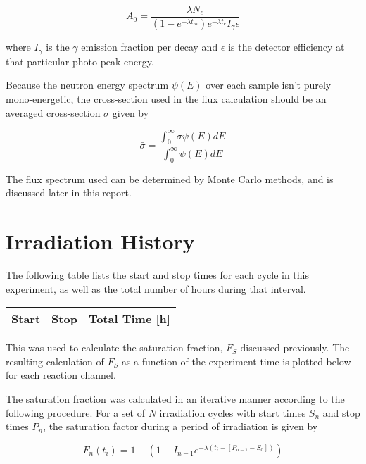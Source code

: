 \documentclass[aps,twocolumn,secnumarabic,balancelastpage,amsmath,amssymb,nofootinbib,floatfix]{revtex4-1}
\begin{document}
\begin{equation}
A_0 = \frac{\lambda N_c}{(1-e^{-\lambda t_m})e^{-\lambda t_c}I_{\gamma}\epsilon}
\label{eq:activity}
\end{equation}

where $I_{\gamma}$ is the $\gamma$ emission fraction per decay and $\epsilon$ is the detector efficiency at that particular photo-peak energy.

Because the neutron energy spectrum $\psi(E)$ over each sample isn't purely mono-energetic, the cross-section used in the flux calculation should be an averaged cross-section $\bar{\sigma}$ given by

\begin{equation}
\bar{\sigma} = \frac{\int_0^{\infty}\sigma\psi(E)dE}{\int_0^{\infty}\psi(E)dE}
\label{eq:avg_xs}
\end{equation}

The flux spectrum used can be determined by Monte Carlo methods, and is discussed later in this report.

\section{Irradiation History}

The following table lists the start and stop times for each cycle in this experiment, as well as the total number of hours during that interval. \\

\begin{ruledtabular}
\begin{tabular}{ccc}
Start & Stop & Total Time [h] \\ 
\hline

\end{tabular}
\end{ruledtabular}

This was used to calculate the saturation fraction, $F_S$ discussed previously.  The resulting calculation of $F_S$ as a function of the experiment time is plotted below for each reaction channel.



The saturation fraction was calculated in an iterative manner according to the following procedure.  For a set of $N$ irradiation cycles with start times $S_n$ and stop times $P_n$, the saturation factor during a period of irradiation is given by

\begin{equation}
F_n(t_i) = 1 - (1-I_{n-1}e^{-\lambda(t_i-[P_{n-1}-S_0])})
\end{equation}
\end{document}
